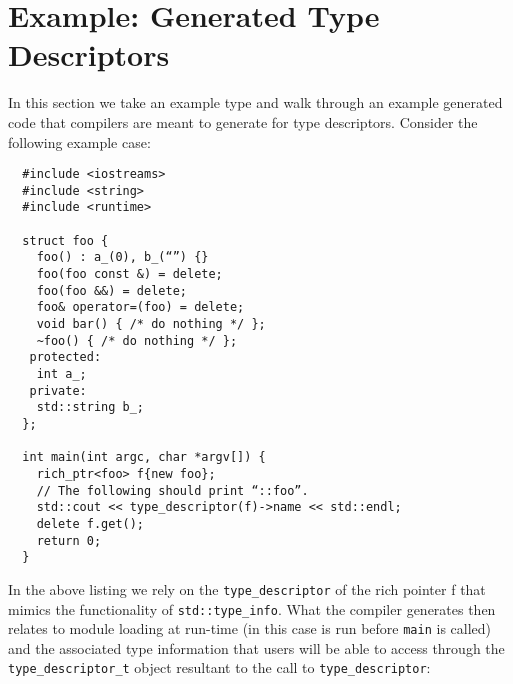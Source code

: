 \section{Example: Generated Type Descriptors}
\label{appendix:example-1}

In this section we take an example type and walk through an example generated
code that compilers are meant to generate for type descriptors. Consider the
following example case:

\begin{verbatim}
  #include <iostreams>
  #include <string>
  #include <runtime>

  struct foo {
    foo() : a_(0), b_(“”) {}
    foo(foo const &) = delete;
    foo(foo &&) = delete;
    foo& operator=(foo) = delete;
    void bar() { /* do nothing */ };
    ~foo() { /* do nothing */ };
   protected:
    int a_;
   private:
    std::string b_;
  };

  int main(int argc, char *argv[]) {
    rich_ptr<foo> f{new foo};
    // The following should print “::foo”.
    std::cout << type_descriptor(f)->name << std::endl;
    delete f.get();
    return 0;
  }
\end{verbatim}

In the above listing we rely on the \verb+type_descriptor+ of the rich pointer f
that mimics the functionality of \verb+std::type_info+. What the compiler
generates then relates to module loading at run-time (in this case is run before
\verb+main+ is called) and the associated type information that users will be
able to access through the \verb+type_descriptor_t+ object resultant to the call
to \verb+type_descriptor+:

